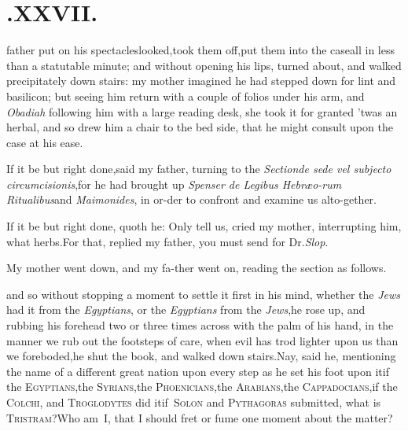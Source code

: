 \documentclass{article}
\begin{document}
\section{.\enspace  XXVII.}

 father put on his
spectacles\tsk looked,\tsk took them off,\tsk put them into
the case\tsk all in less than a statutable minute; and without
opening his lips, turned about, and walked precipitately down
stairs: my mother imagined he had stepped down for lint and
basilicon; but seeing him return with a couple of folios under his
arm, and \textit{Obadiah} following him with a large reading
desk,
she took it for granted ’twas an herbal, and so drew him a
chair to the bed side, that he might consult upon the case at his
ease.

\tsk If it be but right done,\tsk said my father, turning to the
\textit{Section\tsk de sede vel subjecto circumcisionis},\tsk for he had
brought up \textit{Spenser de Legibus
Hebræo-\break rum Ritualibus}\tsk and
\textit{Maimonides}, in or-\break der to confront and examine us alto-\break gether.\tsk

\tsh If it be but right done, quoth he:\break
\tsk Only tell
us, cried my mother, inter\-rupting him, what herbs.\tsk For that,\break
replied my father, you must send for\break 
Dr.\@ \textit{Slop}.

My mother went down, and my fa-\break ther went on, reading the section
as\break
follows.

\noindent
\stick{\indent \astfill}\break
\stick{\astfill}
\stick{\astfill}
\stick{\astfill}
\break
\tsh and so without stopping a moment to settle\enlargethispage{2\baselineskip}
it first in his mind, whether the \textit{Jews} had it from the
\textit{Egyptians}, or the \textit{Egyptians} from the
\textit{Jews},\tsk he rose up, and rubbing his forehead two or
three times across with the palm of his hand, in the
manner we rub out the footsteps of care, when evil has trod lighter
upon us than we foreboded,\tsk he shut the book, and walked down
stairs.\tsk Nay, said he, mentioning the name of a different
great nation upon every step as he set his foot upon it\tsk if
the \textsc{Egyptians},\tsk the
\textsc{Sy\-rians},\tsk the
\textsc{Phoenicians},\tsk the
\textsc{Ara\-bians},\tsk the
\textsc{Cappadocians},\tsh if the
\textsc{Colchi}, and \textsc{Troglodytes} did
it\tsh if~\textsc{Solon} and
\textsc{Pythagoras} submitted,\break
\tsk what is \textsc{Tristram}?\tsh Who am~I, that I should fret
or fume one moment\break
about the matter?
\end{document}
